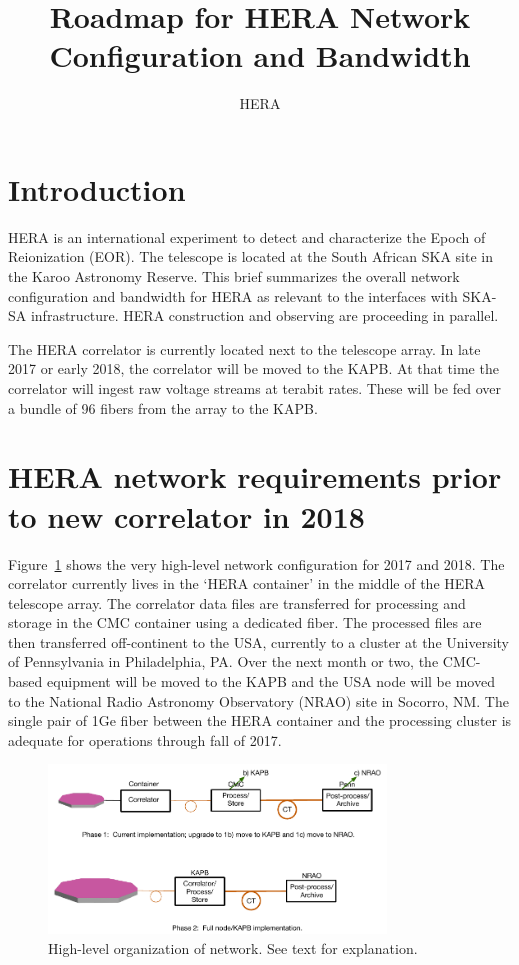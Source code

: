 \documentclass{article}
\begin{document}
\author{HERA}
\title{Roadmap for HERA Network Configuration and Bandwidth}
\maketitle

\section{Introduction}
HERA is an international experiment to detect and characterize the Epoch of
Reionization (EOR).  The telescope is located at the South African SKA site in
the Karoo Astronomy Reserve.  This brief summarizes the overall network
configuration and bandwidth for HERA as relevant to the interfaces with SKA-SA
infrastructure.  HERA construction and observing are proceeding in parallel.

The HERA correlator is currently located next to the telescope array. In late 2017 or early 2018, the correlator will be moved to the KAPB. At that time the correlator will ingest raw voltage streams at terabit rates. These will be fed over a bundle of 96 fibers from the array to the KAPB.

\section{HERA network requirements prior to new correlator in 2018}
Figure~\ref{fig:hi_level} shows the very high-level network configuration for
2017 and 2018.  The correlator currently lives in the `HERA container' in the
middle of the HERA telescope array.  The correlator data files are transferred for processing and storage in the CMC container using a dedicated fiber.  The processed files are then transferred off-continent to the USA, currently to a cluster at the University of Pennsylvania in Philadelphia, PA.  Over the next month or two, the CMC-based equipment will be moved to the KAPB and the USA node will be moved to the National Radio Astronomy Observatory (NRAO) site in Socorro, NM.  The single pair of 1Ge fiber between the HERA container and the processing cluster is adequate for operations through fall of 2017.

\begin{figure}[H]
\includegraphics[width=0.8\textwidth]{network.pdf}
\centering
\caption{High-level organization of network.  See text for explanation.}
\label{fig:hi_level}
\end{figure}
\end{document}
